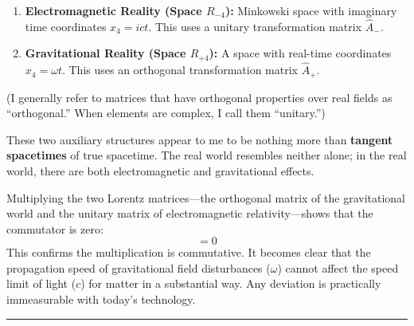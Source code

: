 \documentclass[11pt,a4paper,oneside]{article}
\newcommand{\hr}{\par\vspace{2em}\noindent\rule{\linewidth}{0.4pt}\par\vspace{2em}}
\begin{document}
\begin{enumerate}
    \item \textbf{Electromagnetic Reality (Space $R_{-4}$):} Minkowski space with imaginary time coordinates $x_4 = ict$. This uses a unitary transformation matrix $\hat{A}_{-}$.
    \item \textbf{Gravitational Reality (Space $R_{+4}$):} A space with real-time coordinates $x_4 = \omega t$. This uses an orthogonal transformation matrix $\hat{A}_{+}$.
\end{enumerate}

(I generally refer to matrices that have orthogonal properties over real fields as ``orthogonal.'' When elements are complex, I call them ``unitary.'')

\begin{center}
\end{center}

These two auxiliary structures appear to me to be nothing more than \textbf{tangent spacetimes} of true spacetime. The real world resembles neither alone; in the real world, there are both electromagnetic and gravitational effects.

Multiplying the two Lorentz matrices—the orthogonal matrix of the gravitational world and the unitary matrix of electromagnetic relativity—shows that the commutator is zero:
\begin{equation}
    [\hat{A}_{+}, \hat{A}_{-}] = 0
\end{equation}
This confirms the multiplication is commutative. It becomes clear that the propagation speed of gravitational field disturbances ($\omega$) cannot affect the speed limit of light ($c$) for matter in a substantial way. Any deviation is practically immeasurable with today's technology.

\hr
\end{document}
